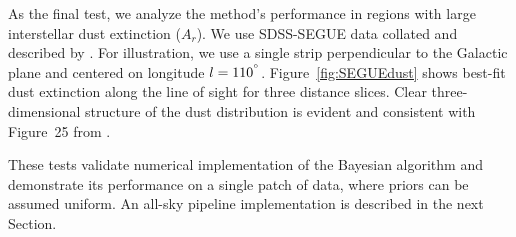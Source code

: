 As the final test, we analyze the method's performance in regions with large interstellar dust extinction ($A_r$). We use SDSS-SEGUE data
collated and described by \cite{2012ApJ...757..166B}. For illustration, we use a single strip perpendicular to the Galactic
plane and centered on longitude $l=110^{\degree}$. Figure~\ref{fig:SEGUEdust} shows best-fit dust extinction along the
line of sight for three distance slices. Clear three-dimensional structure of the dust distribution is evident and consistent with
Figure~25 from \cite{2012ApJ...757..166B}.
 
These tests validate numerical implementation of the Bayesian algorithm and demonstrate its performance on a single patch of data, where priors
can be assumed uniform. An all-sky pipeline implementation is described in the next Section.
